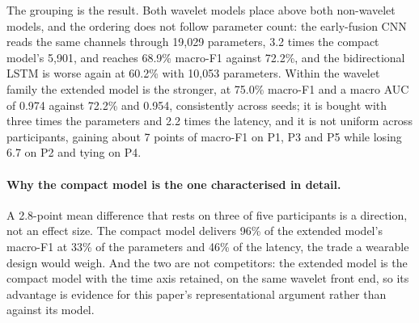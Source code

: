 \documentclass[pdflatex,sn-nature,iicol]{sn-jnl}
\begin{document}
The grouping is the result. Both wavelet models place above both non-wavelet models, and the ordering does not follow parameter count: the early-fusion CNN reads the same channels through 19,029 parameters, 3.2 times the compact model's 5,901, and reaches 68.9\% macro-F1 against 72.2\%, and the bidirectional LSTM is worse again at 60.2\% with 10,053 parameters. Within the wavelet family the extended model is the stronger, at 75.0\% macro-F1 and a macro AUC of 0.974 against 72.2\% and 0.954, consistently across seeds; it is bought with three times the parameters and 2.2 times the latency, and it is not uniform across participants, gaining about 7 points of macro-F1 on P1, P3 and P5 while losing 6.7 on P2 and tying on P4.

\paragraph{Why the compact model is the one characterised in detail.} A 2.8-point mean difference that rests on three of five participants is a direction, not an effect size. The compact model delivers 96\% of the extended model's macro-F1 at 33\% of the parameters and 46\% of the latency, the trade a wearable design would weigh. And the two are not competitors: the extended model is the compact model with the time axis retained, on the same wavelet front end, so its advantage is evidence for this paper's representational argument rather than against its model.
\end{document}
